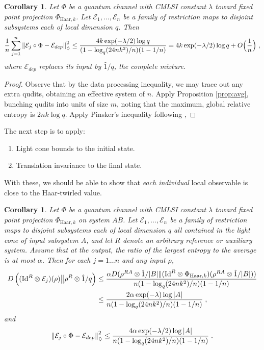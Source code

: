 \documentclass[11pt,reqno]{amsart}
\newtheorem{cor}[lemma]{Corollary}
\newcommand{\E}{\mathcal{E}}
\newcommand{\id}{\hat{1}}
\newcommand{\Id}{\mathrm{Id}}
\newcommand{\pl}{\hspace{.1cm}}
\begin{document}
\begin{cor}
    Let $\Phi$ be a quantum channel with CMLSI constant $\lambda$ toward fixed point projection $\Phi_{\mathrm{Haar},k}$. Let $\E_1, \dots, \E_{n}$ be a family of restriction maps to disjoint subsystems each of local dimension $q$. Then
    \begin{equation*}
        \frac{1}{n} \sum_{j=1}^{n} \left \| \E_j \circ \Phi - \E_{dep} \right \|_{\Diamond}^2 \leq \frac{ 4 k \exp(-\lambda /2) \log q }{(1 - \log_q (24 n k^2) / n)(1 - 1/n)} = 4 k \exp(-\lambda / 2) \log q  + O \Big ( \frac{1}{n} \Big ) \pl,
    \end{equation*}
    where $\E_{dep}$ replaces its input by $\id / q$, the complete mixture.
\end{cor}
\begin{proof}
    Observe that by the data processing inequality, we may trace out any extra qudits, obtaining an effective system of $n$. Apply Proposition \ref{prop:avg}, bunching qudits into units of size $m$, noting that the maximum, global relative entropy is $2 n k \log q$. Apply Pinsker's inequality following , 
\end{proof}
The next step is to apply:
\begin{enumerate}
    \item Light cone bounds to the initial state.
    \item Translation invariance to the final state.
\end{enumerate}
With these, we should be able to show that \textit{each individual} local observable is close to the Haar-twirled value.
\begin{cor} \label{cor:local}
    Let $\Phi$ be a quantum channel with CMLSI constant $\lambda$ toward fixed point projection $\Phi_{\mathrm{Haar},k}$ on system $AB$. Let $\E_1, \dots, \E_{n}$ be a family of restriction maps to disjoint subsystems each of local dimension $q$ all contained in the light cone of input subsystem $A$, and let $R$ denote an arbitrary reference or auxiliary system. Assume that at the output, the ratio of the largest entropy to the average is at most $\alpha$. Then for each $j = 1 \dots n$ and any input $\rho$,
    \begin{equation}
    \begin{split}
    D \left ((\Id^R \otimes \E_j)(\rho) \big \| \rho^{R} \otimes \id / q \right)
    & \leq \frac{\alpha D(\rho^{RA} \otimes \id /|B| \| (\Id^R \otimes \Phi_{\mathrm{Haar},k})(\rho^{RA} \otimes \id / |B|))}{n (1 - \log_q (24 n k^2) / n)(1 - 1/n)}
    \\ & \leq \frac{2 \alpha \exp(-\lambda) \log |A|}{n (1 - \log_q (24 n k^2) / n)(1 - 1/n)} \pl,
    \end{split}
    \end{equation}
    and
    \begin{equation}
        \left \| \E_j \circ \Phi - \E_{dep} \right \|_{\Diamond}^2
        \leq \frac{4 \alpha \exp(-\lambda / 2) \log |A|}{n (1 - \log_q (24 n k^2) / n)(1 - 1/n)} \pl.
    \end{equation}
\end{cor}
\end{document}
